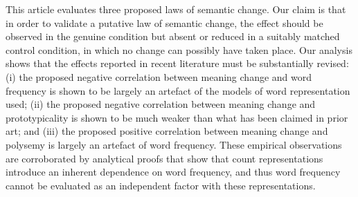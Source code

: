 This article evaluates three proposed laws of semantic change. Our claim is that in order to validate a putative law of semantic change, the effect should be observed in the genuine condition but absent or reduced in a suitably matched control condition, in which no change can possibly have taken place. Our analysis shows that the effects reported in recent literature must be substantially revised: (i) the proposed negative correlation between meaning change and word frequency is shown to be largely an artefact of the models of word representation used; (ii) the proposed negative correlation between meaning change and prototypicality is shown to be much weaker than what has been claimed in prior art; and (iii) the proposed positive correlation between meaning change and polysemy is largely an artefact of word frequency. These empirical observations are corroborated by analytical proofs that show that count representations introduce an inherent dependence on word frequency, and thus word frequency cannot be evaluated as an independent factor with these representations.
